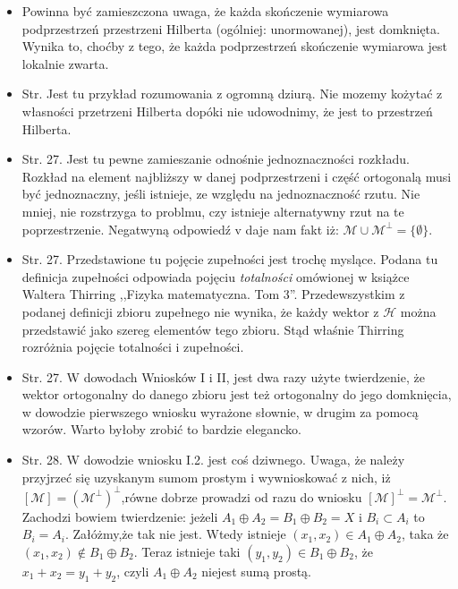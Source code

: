 \begin{itemize}
\item Powinna być zamieszczona uwaga, że każda skończenie wymiarowa
  podprzestrzeń przestrzeni Hilberta (ogólniej: unormowanej), jest
  domknięta. Wynika to, choćby z tego, że każda podprzestrzeń
  skończenie wymiarowa jest lokalnie zwarta.
\item Str. Jest tu przykład rozumowania z ogromną dziurą. Nie mozemy
  kożytać z własności przetrzeni Hilberta dopóki nie udowodnimy, że
  jest to przestrzeń Hilberta.
\item Str. 27. Jest tu pewne zamieszanie odnośnie jednoznaczności
  rozkładu. Rozkład na element najbliższy w danej podprzestrzeni i
  część ortogonalą musi być jednoznaczny, jeśli istnieje, ze względu
  na jednoznaczność rzutu. Nie mniej, nie rozstrzyga to problmu, czy
  istnieje alternatywny rzut na te poprzestrzenie. Negatwyną odpowiedź
  v daje nam fakt iż:
  $\mathcal{ M } \cup \mathcal{ M }^{ \bot } = \{ \emptyset \}$.
\item Str. 27. Przedstawione tu pojęcie zupełności jest trochę
  myslące. Podana tu definicja zupełności odpowiada pojęciu
  \emph{totalności} omówionej w książce Waltera Thirring ,,Fizyka
  matematyczna. Tom 3''. Przedewszystkim z podanej definicji zbioru
  zupełnego nie wynika, że każdy wektor z $\mathcal{ H }$ można
  przedstawić jako szereg elementów tego zbioru. Stąd właśnie Thirring
  rozróżnia pojęcie totalności i zupełności.
\item Str. 27. W dowodach Wniosków I i II, jest dwa razy użyte
  twierdzenie, że wektor ortogonalny do danego zbioru jest też
  ortogonalny do jego domknięcia, w dowodzie pierwszego wniosku
  wyrażone słownie, w drugim za pomocą wzorów. Warto byłoby zrobić to
  bardzie elegancko.
\item Str. 28. W dowodzie wniosku I.2. jest coś dziwnego. Uwaga, że
  należy przyjrzeć się uzyskanym sumom prostym i wywnioskować z nich,
  iż $[ \mathcal{ M } ]=( \mathcal{ M }^{ \bot } )^{ \bot }$,równe
  dobrze prowadzi od razu do wniosku
  $[ \mathcal{ M } ]^{ \bot } = \mathcal{ M }^{ \bot }$.  Zachodzi
  bowiem twierdzenie: jeżeli
  $A_{ 1 } \oplus A_{ 2 } = B_{ 1 } \oplus B_{ 2 } = X$ i
  $B_{ i } \subset A_{ i }$ to $B_{ i } = A_{ i }$.  Załóżmy,że tak
  nie jest. Wtedy istnieje
  $( x_{ 1 }, x_{ 2 } ) \in A_{ 1 } \oplus A_{ 2 }$, taka że
  $( x_{ 1 }, x_{ 2 } ) \notin B_{ 1 } \oplus B_{ 2 }$.  Teraz
  istnieje taki $( y_{ 1 }, y_{ 2 } ) \in B_{ 1 } \oplus B_{ 2 }$, że
  $x_{ 1 } + x_{ 2 } = y_{ 1 } + y_{ 2 }$, czyli
  $A_{ 1 } \oplus A_{ 2 }$ niejest sumą prostą.

\end{itemize}
